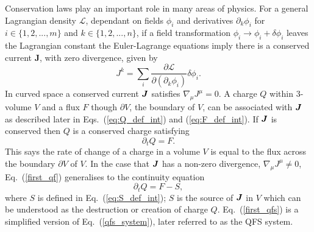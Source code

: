 Conservation laws play an important role in many areas of physics. For a general Lagrangian density $\mathcal{L}$, dependant on fields $\phi_i$ and derivatives $\partial_k \phi_i$ for $i \in \{1,2,...,m \}$ and $k \in \{1,2,...,n \}$, if a field transformation $\phi_i \rightarrow \phi_i + \delta \phi_i$ leaves the Lagrangian constant the Euler-Lagrange equations imply there is a conserved current $\boldsymbol{J}$, with zero divergence, given by
\begin{equation}
J^k = \sum_i \frac{\partial \mathcal{L}}{\partial (\partial_k \phi_i)}\delta \phi_i.
\end{equation}
In curved space a conserved current $\boldsymbol{J}$ satisfies $\nabla_\mu J^\mu = 0$. A charge $Q$ within 3-volume $V$ and a flux $F$ though $\partial V$, the boundary of $V$, can be associated with $\boldsymbol{J}$ as described later in Eqs.~(\ref{eq:Q_def_int}) and (\ref{eq:F_def_int}). If $\boldsymbol{J}$ is conserved then $Q$ is a conserved charge satisfying
\begin{equation}
\label{first_qf}\partial_t Q = {F}.
\end{equation}
This says the rate of change of a charge in a volume $V$ is equal to the flux across the boundary $\partial V$ of $V$. In the case that $\boldsymbol{J}$ has a non-zero divergence, $\nabla_\mu J^\mu \neq 0$, Eq.~(\ref{first_qf}) generalises to the continuity equation
\begin{equation}
\label{first_qfs}\partial_t {Q} = {F} - {S},
\end{equation}
where $S$ is defined in Eq.~(\ref{eq:S_def_int}); ${S}$ is the source of $\boldsymbol{J}$ in $V$ which can be understood as the destruction or creation of charge $Q$. Eq.~(\ref{first_qfs}) is a simplified version of Eq.~(\ref{qfs_system}), later referred to as the QFS system.


